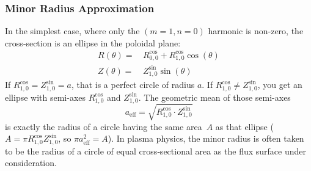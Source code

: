 \subsubsection{Minor Radius Approximation}
%
In the simplest case, where only the $(m=1,n=0)$ harmonic is non‐zero,
the cross‐section is an ellipse in the poloidal plane:
\begin{align}
 R(\theta) =&\, R^\textrm{cos}_{0,0} + R^\textrm{cos}_{1,0} \cos(\theta) \\
 Z(\theta) =&\,                        Z^\textrm{sin}_{1,0} \sin(\theta)
\end{align}
%
If $R^\textrm{cos}_{1,0} = Z^\textrm{sin}_{1,0} = a$, that is a perfect circle of radius $a$.
%
If $R^\textrm{cos}_{1,0} \neq Z^\textrm{sin}_{1,0}$, you get an ellipse with semi-axes $R^\textrm{cos}_{1,0}$ and $Z^\textrm{sin}_{1,0}$.
%
The geometric mean of those semi-axes
\begin{equation}
 a_\textrm{eff} = \sqrt{R^\textrm{cos}_{1,0} \cdot Z^\textrm{sin}_{1,0}} \label{eqn:minor_radius_approximation}
\end{equation}
is exactly the radius of a circle having the same area~$A$ as that ellipse
($A = \pi R^\textrm{cos}_{1,0} Z^\textrm{sin}_{1,0}$, so $\pi a_\textrm{eff}^2 = A$).
In plasma physics, the minor radius is often taken to be the radius of a circle of equal cross‐sectional area
as the flux surface under consideration.

\FloatBarrier
